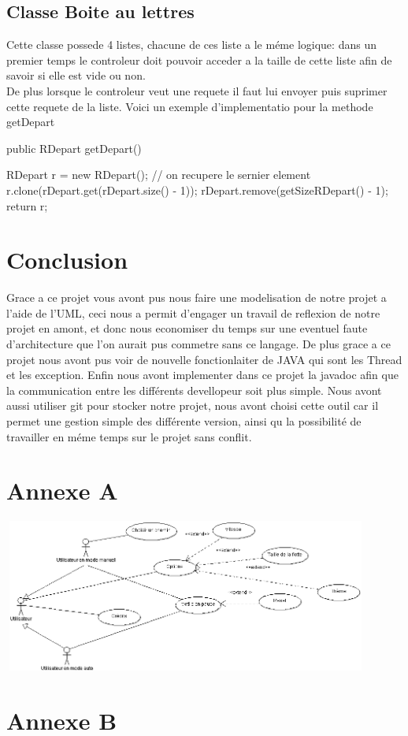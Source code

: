 \documentclass[a4paper, titlepage]{report}
\begin{document}
\section{Classe Boite au lettres}
Cette classe possede 4 listes, chacune de ces liste a le méme logique: dans un premier temps le controleur doit pouvoir acceder a la taille de cette liste afin de savoir si elle est vide ou non.
\\
De plus  lorsque le controleur veut une requete il faut lui envoyer puis suprimer cette requete de la liste. Voici un exemple d'implementatio pour la methode getDepart


public RDepart getDepart() {
		RDepart r = new RDepart();
		// on recupere le sernier element
		r.clone(rDepart.get(rDepart.size() - 1));
		rDepart.remove(getSizeRDepart() - 1);
		return r;

	}


\chapter*{Conclusion}
Grace a ce projet vous avont pus nous faire une modelisation de notre projet a l'aide de l'UML, ceci nous a permit d'engager un travail de reflexion de notre projet en amont, et donc nous economiser du temps sur une eventuel faute d'architecture que l'on aurait pus commetre sans ce langage. De plus grace a ce projet nous avont pus voir de nouvelle fonctionlaiter de JAVA qui sont les Thread et les exception. Enfin nous avont implementer dans ce projet la javadoc afin que la communication entre les différents devellopeur soit plus simple. Nous avont aussi utiliser git pour stocker notre projet, nous avont choisi cette outil car il permet une gestion simple des différente version, ainsi qu la possibilité de travailler en méme temps sur le projet sans conflit.
\appendix
\chapter*{Annexe A}
\includegraphics[width=455px, height=190px]{Images/CasUtilisation.PNG}
\chapter*{Annexe B}
\end{document}
